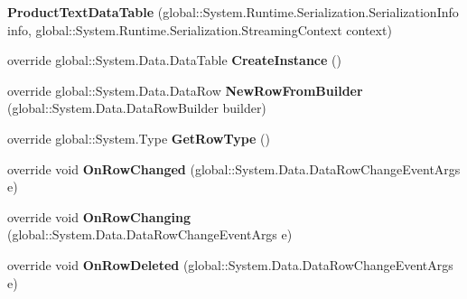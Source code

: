 \begin{DoxyCompactItemize}
\item 
{\bfseries Product\+Text\+Data\+Table} (global\+::\+System.\+Runtime.\+Serialization.\+Serialization\+Info info, global\+::\+System.\+Runtime.\+Serialization.\+Streaming\+Context context)\hypertarget{class_products_1_1_data_1_1ds_sage_1_1_product_text_data_table_adbd1aba27b1242406dc54e37dbf9501d}{}\label{class_products_1_1_data_1_1ds_sage_1_1_product_text_data_table_adbd1aba27b1242406dc54e37dbf9501d}

\item 
override global\+::\+System.\+Data.\+Data\+Table {\bfseries Create\+Instance} ()\hypertarget{class_products_1_1_data_1_1ds_sage_1_1_product_text_data_table_a3321bc4e5c3830c043ec73170bd3e90c}{}\label{class_products_1_1_data_1_1ds_sage_1_1_product_text_data_table_a3321bc4e5c3830c043ec73170bd3e90c}

\item 
override global\+::\+System.\+Data.\+Data\+Row {\bfseries New\+Row\+From\+Builder} (global\+::\+System.\+Data.\+Data\+Row\+Builder builder)\hypertarget{class_products_1_1_data_1_1ds_sage_1_1_product_text_data_table_abaa0a848da3b21307ecbbc670a072dc4}{}\label{class_products_1_1_data_1_1ds_sage_1_1_product_text_data_table_abaa0a848da3b21307ecbbc670a072dc4}

\item 
override global\+::\+System.\+Type {\bfseries Get\+Row\+Type} ()\hypertarget{class_products_1_1_data_1_1ds_sage_1_1_product_text_data_table_a1be37e3c708c77978f3084ffd3b15573}{}\label{class_products_1_1_data_1_1ds_sage_1_1_product_text_data_table_a1be37e3c708c77978f3084ffd3b15573}

\item 
override void {\bfseries On\+Row\+Changed} (global\+::\+System.\+Data.\+Data\+Row\+Change\+Event\+Args e)\hypertarget{class_products_1_1_data_1_1ds_sage_1_1_product_text_data_table_a0dec1d1e3b094444992599899cc8c7ef}{}\label{class_products_1_1_data_1_1ds_sage_1_1_product_text_data_table_a0dec1d1e3b094444992599899cc8c7ef}

\item 
override void {\bfseries On\+Row\+Changing} (global\+::\+System.\+Data.\+Data\+Row\+Change\+Event\+Args e)\hypertarget{class_products_1_1_data_1_1ds_sage_1_1_product_text_data_table_a391cee4b1c47cb7f82794c912f0e2ab7}{}\label{class_products_1_1_data_1_1ds_sage_1_1_product_text_data_table_a391cee4b1c47cb7f82794c912f0e2ab7}

\item 
override void {\bfseries On\+Row\+Deleted} (global\+::\+System.\+Data.\+Data\+Row\+Change\+Event\+Args e)\hypertarget{class_products_1_1_data_1_1ds_sage_1_1_product_text_data_table_a74755834b76dca433aa561e3d6aa2ba5}{}\label{class_products_1_1_data_1_1ds_sage_1_1_product_text_data_table_a74755834b76dca433aa561e3d6aa2ba5}


\end{DoxyCompactItemize}
